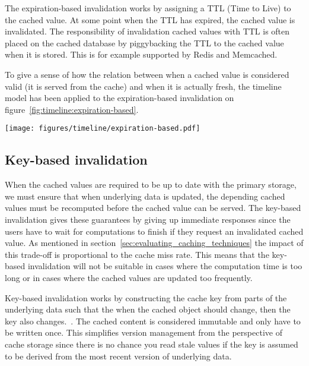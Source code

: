 The expiration-based invalidation works by assigning a TTL (Time to Live) to the cached value. At some point when the TTL has expired, the cached value is invalidated. The responsibility of invalidation cached values with TTL is often placed on the cached database by piggybacking the TTL to the cached value when it is stored. This is for example supported by Redis and Memcached.

To give a sense of how the relation between when a cached value is considered valid (it is served from the cache) and when it is actually fresh, the timeline model has been applied to the expiration-based invalidation on figure~\ref{fig:timeline:expiration-based}.

\begin{figure*}[ht!]
  \centering
  \texttt{[image: figures/timeline/expiration-based.pdf]}
  \caption{The lifecycle of the expiration-based invalidation technique}
  \label{fig:timeline:expiration-based}
\end{figure*}


\subsection{Key-based invalidation}
\label{subsec:key_based_invalidation}

When the cached values are required to be up to date with the primary storage, we must ensure that when underlying data is updated, the depending cached values must be recomputed before the cached value can be served. The key-based invalidation gives these guarantees by giving up immediate responses since the users have to wait for computations to finish if they request an invalidated cached value. As mentioned in section~\ref{sec:evaluating_caching_techniques} the impact of this trade-off is proportional to the cache miss rate. This means that the key-based invalidation will not be suitable in cases where the computation time is too long or in cases where the cached values are updated too frequently.

Key-based invalidation works by constructing the cache key from parts of the underlying data such that the when the cached object should change, then the key also changes.~\cite{blog:key-based-invalidation}. The cached content is considered immutable and only have to be written once. This simplifies version management from the perspective of cache storage since there is no chance you read stale values if the key is assumed to be derived from the most recent version of underlying data.

